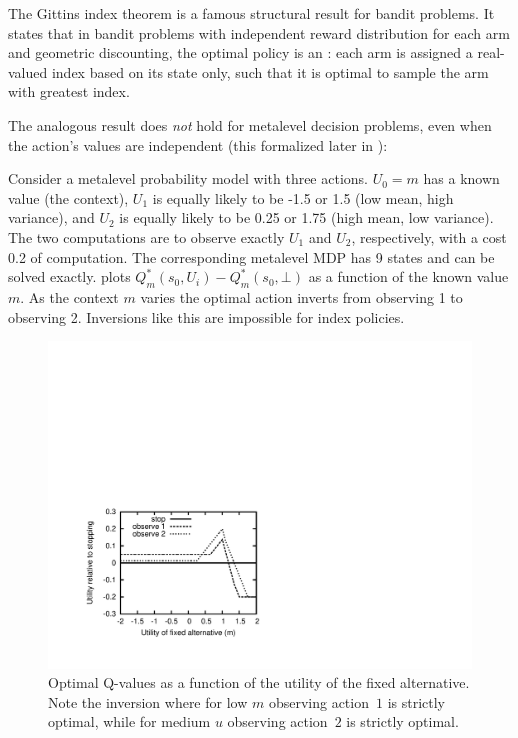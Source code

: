 

The Gittins index theorem \citep{Gittins:1979} is a famous structural
result for bandit problems.  It states that in bandit problems with
independent reward distribution for each arm and geometric discounting,
the optimal policy is an :  each arm is assigned a
real-valued index based on its state only, such that it is optimal to
sample the arm with greatest index.

The analogous result does \emph{not} hold for metalevel decision problems,
even when the action's values are independent (this formalized later in ):

\begin{example}
Consider a metalevel probability model with three actions. 
	$U_0=m$ has a known value (the context),
	$U_1$ is equally likely to be -1.5 or 1.5 (low mean, high variance),
	and $U_2$ is equally likely to be 0.25 or 1.75 (high mean, low variance).
The two computations are to observe exactly $U_1$ and $U_2$, respectively, with a cost 0.2 of computation.
The corresponding metalevel MDP has 9 states and can be solved exactly.
 plots $Q^*_m(s_0,U_i) - Q^*_m(s_0,\bot)$ as a function of the known value $m$.
As the context $m$ varies the optimal action inverts from observing 1 to observing 2.
Inversions like this are impossible for index policies.
\end{example}

\begin{figure}[htb]
\centering
\includegraphics[scale=0.7, trim=90 70 400 300]{swap-counterex.pdf}
\caption{Optimal Q-values as a function of the utility of the fixed alternative.  Note the inversion
where for low $m$ observing action~$1$ is strictly optimal, while for medium $u$ observing action~$2$ is strictly optimal.}
\label{fig:swap-counterex}
\end{figure}


